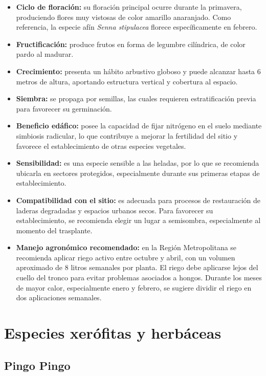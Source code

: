 \documentclass[11pt,a4paper]{article}
\newcommand{\Needspace}[1]{}
\begin{document}
\begin{itemize}[leftmargin=1.2cm]
    \item \textbf{Ciclo de floración:} su floración principal ocurre durante la primavera, produciendo flores muy vistosas de color amarillo anaranjado. Como referencia, la especie afín \textit{Senna stipulacea} florece específicamente en febrero.
    \item \textbf{Fructificación:} produce frutos en forma de legumbre cilíndrica, de color pardo al madurar.
    \item \textbf{Crecimiento:} presenta un hábito arbustivo globoso y puede alcanzar hasta 6 metros de altura, aportando estructura vertical y cobertura al espacio.
    \item \textbf{Siembra:} se propaga por semillas, las cuales requieren estratificación previa para favorecer su germinación.
    \item \textbf{Beneficio edáfico:} posee la capacidad de fijar nitrógeno en el suelo mediante simbiosis radicular, lo que contribuye a mejorar la fertilidad del sitio y favorece el establecimiento de otras especies vegetales.
    \item \textbf{Sensibilidad:} es una especie sensible a las heladas, por lo que se recomienda ubicarla en sectores protegidos, especialmente durante sus primeras etapas de establecimiento.
    \item \textbf{Compatibilidad con el sitio:} es adecuada para procesos de restauración de laderas degradadas y espacios urbanos secos. Para favorecer su establecimiento, se recomienda elegir un lugar a semisombra, especialmente al momento del trasplante.
    \item \textbf{Manejo agronómico recomendado:} en la Región Metropolitana se recomienda aplicar riego activo entre octubre y abril, con un volumen aproximado de 8 litros semanales por planta. El riego debe aplicarse lejos del cuello del tronco para evitar problemas asociados a hongos. Durante los meses de mayor calor, especialmente enero y febrero, se sugiere dividir el riego en dos aplicaciones semanales.
\end{itemize}

\newpage

\section{Especies xerófitas y herbáceas}

\Needspace{7cm}
\subsection{Pingo Pingo}
\end{document}
